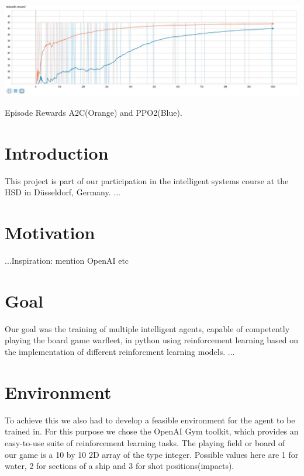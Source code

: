 \documentclass[sigconf]{acmart}
\begin{document}
\begin{teaserfigure}
 \includegraphics[width=\textwidth]{episode_reward_big} %
  \caption{Episode Rewards A2C(Orange) and PPO2(Blue).}
  \label{fig:teaser}
\end{teaserfigure}

\maketitle 

\section{Introduction}
 This project is part of our participation in the intelligent systems course at the HSD in Düsseldorf, Germany.
 ...

\section{Motivation}
 ...Inspiration: mention OpenAI etc

\section{Goal}
 Our goal was the training of multiple intelligent agents, capable of competently playing the board game warfleet, in python using reinforcement learning based on the implementation of different reinforcment learning models.
 ...

\section{Environment}
To achieve this we also had to develop a feasible environment for the agent to be trained in. For this purpose we chose the OpenAI Gym toolkit, which provides an easy-to-use suite of reinforcement learning tasks.
The playing field or board of our game is a 10 by 10 2D array of the type integer. Possible values here are 1 for water, 2 for sections of a ship and 3 for shot positions(impacts).
\end{document}
